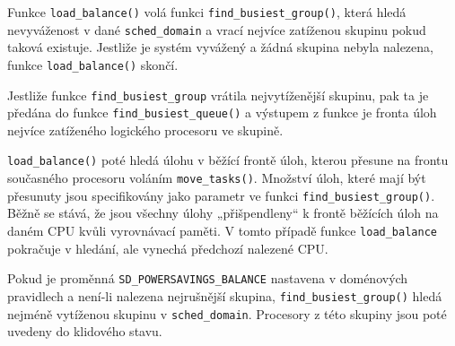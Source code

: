 \documentclass[
  field=ainfk,
  biblatex,
  glossaries,
  index
]{kidiplom}
\begin{document}
Funkce \verb#load_balance()# volá funkci \verb#find_busiest_group()#, která hledá nevyváženost v dané \verb#sched_domain# a vrací nejvíce zatíženou skupinu pokud taková existuje. Jestliže je systém vyvážený a žádná skupina nebyla nalezena, funkce \verb#load_balance()# skončí.

Jestliže funkce \verb#find_busiest_group# vrátila nejvytíženější skupinu, pak ta je předána do funkce \verb#find_busiest_queue()# a výstupem z funkce je fronta úloh nejvíce zatíženého logického procesoru ve skupině.

\verb#load_balance()# poté hledá úlohu v běžící frontě úloh, kterou přesune na frontu současného procesoru voláním \verb#move_tasks()#. Množství úloh, které mají být přesunuty jsou specifikovány jako parametr ve funkci \newline \verb#find_busiest_group()#. Běžně se stává, že jsou všechny úlohy „přišpendleny“ k frontě běžících úloh na daném CPU kvůli vyrovnávací paměti. V tomto případě funkce \verb#load_balance# pokračuje v hledání, ale vynechá předchozí nalezené CPU.

Pokud je proměnná \verb#SD_POWERSAVINGS_BALANCE# nastavena v doménových pravidlech a není-li nalezena nejrušnější skupina, \verb#find_busiest_group()# hledá nejméně vytíženou skupinu v \verb#sched_domain#. Procesory z této skupiny jsou poté uvedeny do klidového stavu. 
\end{document}

